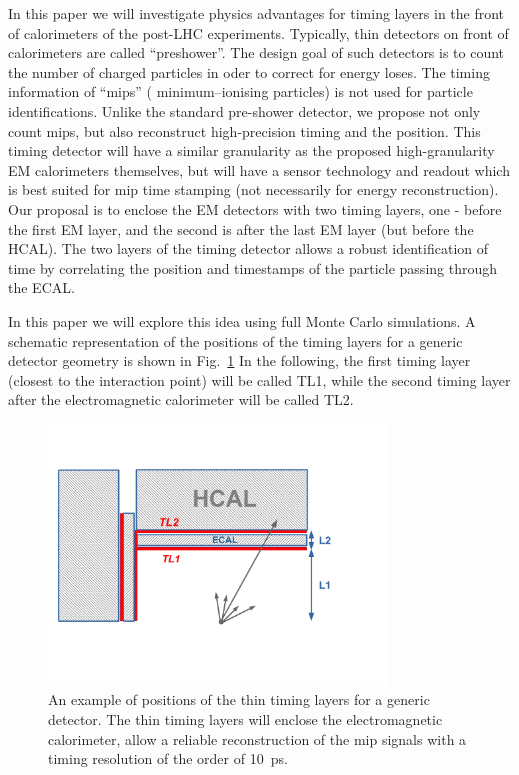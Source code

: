 \documentclass[final,1p,11pt]{elsarticle}
\begin{document}
In this paper we  will investigate physics advantages for timing layers in the front of calorimeters  
of the post-LHC experiments. 
Typically, thin detectors on front of calorimeters are called ``preshower''. The design goal of such detectors is to count the number of charged
particles in oder to correct for energy loses. The timing information of ``mips'' ( minimum–ionising particles) is not used for particle identifications. 
Unlike the standard pre-shower detector, we propose not only count mips, but also reconstruct high-precision timing and the position.
This timing detector will have a similar granularity as the proposed high-granularity EM calorimeters themselves, 
but will have a sensor technology and readout which is best suited for mip time stamping (not necessarily for energy reconstruction). 
Our proposal is to enclose the EM detectors with two timing layers, one - before the first EM layer, and the second is after the last EM layer (but before
the HCAL). The two layers of the timing detector allows a robust identification of time by correlating the position and timestamps of the particle passing through
the ECAL.

In this paper we will explore this idea using full Monte Carlo simulations. 
A schematic representation of the positions of the timing layers for a generic detector geometry is shown in Fig.~\ref{fig:eff_rad}
In the following, the first timing layer (closest to the interaction point) will be called TL1, while the second timing layer after the electromagnetic calorimeter will be called TL2.

\begin{figure}
\begin{center}
   \includegraphics[width=0.8\textwidth]{timing_layer.pdf}\hfill
\end{center}
\caption{An example of positions of the thin timing layers for a generic detector. The thin timing layers  will enclose the electromagnetic calorimeter, allow a reliable reconstruction of the  mip signals with a timing resolution of the order of 10~ps.}
\label{fig:eff_rad}
\end{figure}
\end{document}
